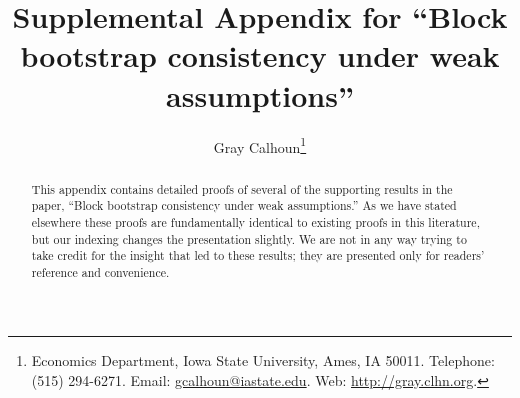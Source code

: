 \documentclass[11pt]{article}
\begin{document}
\author{Gray Calhoun\thanks{Economics Department, Iowa State
    University, Ames, IA 50011. Telephone: (515) 294-6271.  Email:
    \protect\url{gcalhoun@iastate.edu}. Web:
    \protect\url{http://gray.clhn.org}.}}

\title{Supplemental Appendix for ``Block bootstrap consistency under
  weak assumptions''}

\maketitle

\begin{abstract}
  \noindent This appendix contains detailed proofs of several of the
  supporting results in the paper, ``Block bootstrap consistency under
  weak assumptions.'' As we have stated elsewhere these proofs are
  fundamentally identical to existing proofs in this literature, but
  our indexing changes the presentation slightly. We are not in any
  way trying to take credit for the insight that led to these results;
  they are presented only for readers' reference and convenience.
\end{abstract}
\end{document}
